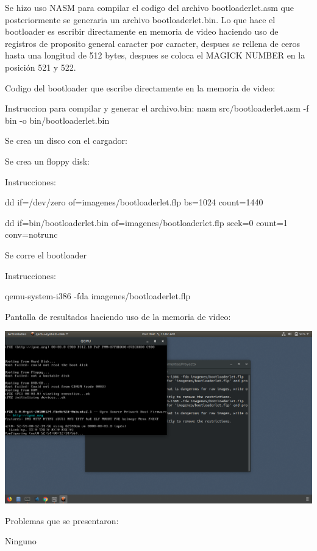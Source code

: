 \documentclass[12pt, a4paper]{report}
\begin{document}
\begin{center}
Se hizo uso NASM para compilar el codigo del archivo bootloaderlet.asm que posteriormente se generaria un archivo bootloaderlet.bin. Lo que hace el bootloader es escribir directamente en memoria de video haciendo uso de registros de proposito general caracter por caracter, despues se rellena de ceros hasta una longitud de 512 bytes, despues se coloca el MAGICK NUMBER en la posición 521 y 522.

\bigskip
\bigskip

\begin{flushleft}
Codigo del bootloader que escribe directamente en la memoria de video:

\bigskip
\bigskip


\end{flushleft}


Instruccion para compilar y generar el archivo.bin: nasm src/bootloaderlet.asm -f bin -o  bin/bootloaderlet.bin

\bigskip
\end{center}
\begin{center}
Se crea un disco con el cargador:

Se crea un floppy disk:

Instrucciones: 
\bigskip

dd if=/dev/zero of=imagenes/bootloaderlet.flp bs=1024 count=1440

\bigskip

dd if=bin/bootloaderlet.bin of=imagenes/bootloaderlet.flp seek=0 count=1 conv=notrunc

\bigskip

Se corre el bootloader

\bigskip

Instrucciones:

\bigskip

qemu-system-i386 -fda imagenes/bootloaderlet.flp

\bigskip

Pantalla de resultados haciendo uso de la memoria de video:

\bigskip

\includegraphics[scale=.3]{memoria.png}

\bigskip




\end{center}
\newpage



\begin{center}
Problemas que se presentaron: 

Ninguno


\bigskip

\end{center}
\end{document}
